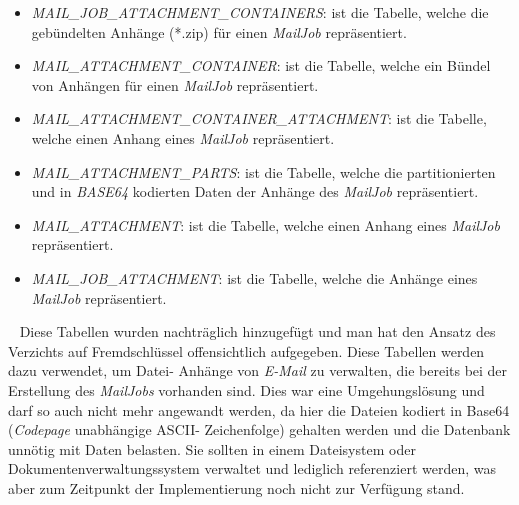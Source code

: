 \begin{itemize}
	\item\emph{MAIL\_JOB\_ATTACHMENT\_CONTAINERS}:
	\newline
	ist die Tabelle, welche die gebündelten Anhänge (*.zip) für einen \emph{MailJob} repräsentiert.
	\item\emph{MAIL\_ATTACHMENT\_CONTAINER}:
	\newline
	ist die Tabelle, welche ein Bündel von Anhängen für einen \emph{MailJob} repräsentiert.
	\item\emph{MAIL\_ATTACHMENT\_CONTAINER\_ATTACHMENT}:
	\newline
	ist die Tabelle, welche einen Anhang eines \emph{MailJob} repräsentiert.
	\item\emph{MAIL\_ATTACHMENT\_PARTS}:
	\newline
	ist die Tabelle, welche die partitionierten und in \emph{BASE64} kodierten Daten der Anhänge des \emph{MailJob} repräsentiert.
	\item\emph{MAIL\_ATTACHMENT}:
	\newline
	ist die Tabelle, welche einen Anhang eines \emph{MailJob} repräsentiert. 
	\item\emph{MAIL\_JOB\_ATTACHMENT}:
	\newline
	ist die Tabelle, welche die Anhänge eines \emph{MailJob} repräsentiert.
\end{itemize}
\ \newline
Diese Tabellen wurden nachträglich hinzugefügt und man hat den Ansatz des Verzichts auf Fremdschlüssel offensichtlich aufgegeben. Diese Tabellen werden dazu verwendet, um Datei- Anhänge von \emph{E-Mail} zu verwalten, die bereits bei der Erstellung des \emph{MailJobs} vorhanden sind. Dies war eine Umgehungslösung und darf so auch nicht mehr angewandt werden, da hier die Dateien kodiert in Base64 (\emph{Codepage} unabhängige ASCII- Zeichenfolge) gehalten werden und die Datenbank unnötig mit Daten belasten. Sie sollten in einem Dateisystem oder Dokumentenverwaltungssystem verwaltet und lediglich referenziert werden, was aber zum Zeitpunkt der Implementierung noch nicht zur Verfügung stand. 
\ \newpage
